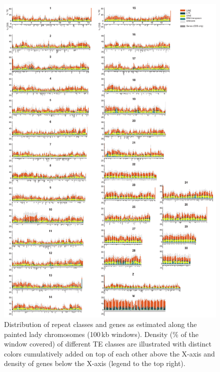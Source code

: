 \documentclass[twocolumn]{bmcart}%
\begin{document}
\begin{figure}[p]
  \caption{Distribution of repeat classes and genes as estimated along the painted lady chromosomes (100\,kb windows). Density (\% of the window covered) of different TE classes are illustrated with distinct colors cumulatively added on top of each other above the X-axis and density of genes below the X-axis (legend to the top right).}
  \label{fig:1} %
  \includegraphics[width=1.8\linewidth]{ShipilinaNasvallFig1opt.pdf}
\end{figure}
\end{document}
